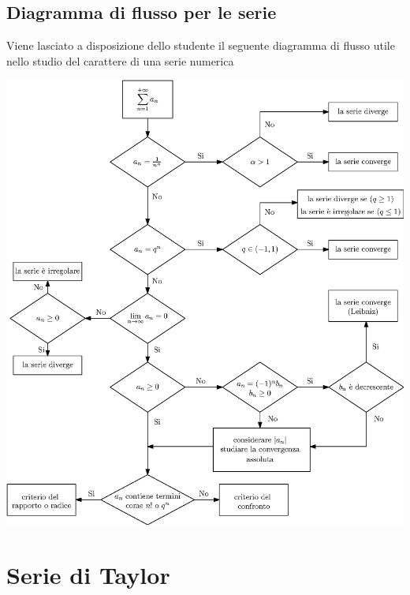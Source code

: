 \documentclass[10pt, letterpaper]{report}
\begin{document}
\subsection{Diagramma di flusso per le serie}
Viene lasciato a disposizione dello studente il seguente diagramma di flusso utile nello
studio del carattere di una serie numerica
\begin{center}
    \includegraphics[width=\textwidth ]{images/diagramma_serie.eps}
\end{center} \flowerLine
\newpage
\section{Serie di Taylor}
\end{document}

